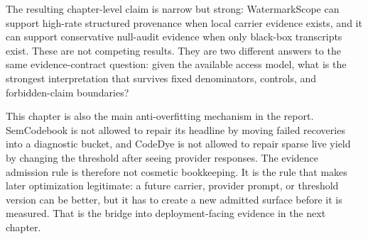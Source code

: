 The resulting chapter-level claim is narrow but strong: WatermarkScope can support high-rate structured provenance when local carrier evidence exists, and it can support conservative null-audit evidence when only black-box transcripts exist. These are not competing results. They are two different answers to the same evidence-contract question: given the available access model, what is the strongest interpretation that survives fixed denominators, controls, and forbidden-claim boundaries?

This chapter is also the main anti-overfitting mechanism in the report. SemCodebook is not allowed to repair its headline by moving failed recoveries into a diagnostic bucket, and CodeDye is not allowed to repair sparse live yield by changing the threshold after seeing provider responses. The evidence admission rule is therefore not cosmetic bookkeeping. It is the rule that makes later optimization legitimate: a future carrier, provider prompt, or threshold version can be better, but it has to create a new admitted surface before it is measured. That is the bridge into deployment-facing evidence in the next chapter.
